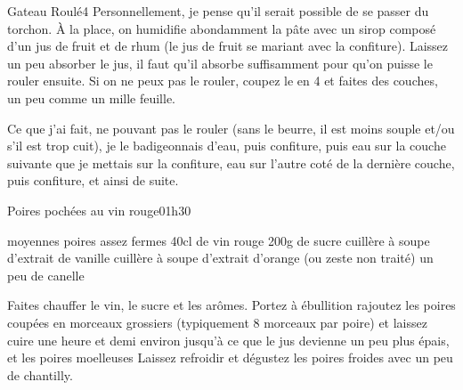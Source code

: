 \begin{recette}{Gateau Roulé}{4}{}{}
Personnellement, je pense qu'il serait possible de se passer du torchon. À la place, on humidifie abondamment la pâte avec un sirop composé d'un jus de fruit et de rhum (le jus de fruit se mariant avec la confiture). Laissez un peu absorber le jus, il faut qu'il absorbe suffisamment pour qu'on puisse le rouler ensuite. Si on ne peux pas le rouler, coupez le en 4 et faites des couches, un peu comme un mille feuille.

Ce que j'ai fait, ne pouvant pas le rouler (sans le beurre, il est moins souple et/ou s'il est trop cuit), je le badigeonnais d'eau, puis confiture, puis eau sur la couche suivante que je mettais sur la confiture, eau sur l'autre coté de la dernière couche, puis confiture, et ainsi de suite.

\end{recette}

\begin{recette}{Poires pochées au vin rouge}{0}{1h30}{}
\begin{ingredients}
 moyennes poires assez fermes
\ingredient 40cl de vin rouge
\ingredient 200g de sucre
 cuillère à soupe d'extrait de vanille
 cuillère à soupe d'extrait d'orange (ou zeste non traité)
\ingredient un peu de canelle
\end{ingredients}

\begin{preparation}
\etape Faites chauffer le vin, le sucre et les arômes. Portez à ébullition
\etape rajoutez les poires coupées en morceaux grossiers (typiquement 8 morceaux par poire) et laissez cuire une heure et demi environ jusqu'à ce que le jus devienne un peu plus épais, et les poires moelleuses
\etape Laissez refroidir et dégustez les poires froides avec un peu de chantilly.
\end{preparation}

\end{recette}

